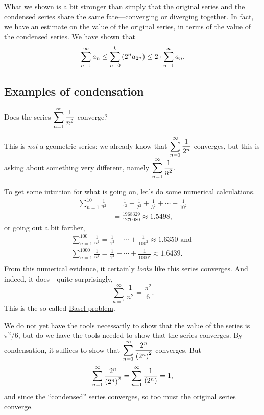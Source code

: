 What we shown is a bit stronger than simply that the original series and the condensed series share the same fate---converging or diverging together.  In fact, we have an estimate on the value of the original series, in terms of the value of the condensed series.  We have shown that
$$
\sum_{n=1}^\infty a_n \leq \displaystyle\sum_{n=0}^k \left( 2^n a_{2^n} \right) \leq 2 \cdot \sum_{n=1}^\infty a_n.
$$

\subsection{Examples of condensation}

\begin{example}
Does the series $\displaystyle\sum_{n=1}^\infty \displaystyle\frac{1}{n^2}$ converge?
\end{example}

This is \textit{not} a geometric series: we already know that $\displaystyle\sum_{n=1}^\infty \displaystyle\frac{1}{2^n}$ converges, but this is asking about something very different, namely $\displaystyle\sum_{n=1}^\infty \displaystyle\frac{1}{n^2}$.

\begin{solution}
To get some intuition for what is going on, let's do some numerical calculations.
\begin{align*}
\sum_{n=1}^{10} \frac{1}{n^2} &= \frac{1}{1^2} + \frac{1}{2^2} + \frac{1}{3^2} + \cdots + \frac{1}{10^2} \\
&= \frac{1968329}{1270080} \approx 1.5498,
\end{align*}
or going out a bit farther,
\begin{align*}
\sum_{n=1}^{100} \frac{1}{n^2} = \frac{1}{1^2} + \cdots + \frac{1}{100^2} \approx 1.6350 \mbox{ and } \\
\sum_{n=1}^{1000} \frac{1}{n^2} = \frac{1}{1^2} + \cdots + \frac{1}{1000^2} \approx 1.6439. \\
\end{align*}
From this numerical evidence, it certainly \textit{looks} like this
series converges.  And indeed, it does---quite surprisingly,
$$
\sum_{n=1}^{\infty} \frac{1}{n^2} = \frac{\pi^{2}}{6}.
$$
This is the so-called
\href{http://en.wikipedia.org/wiki/Basel_problem}{Basel
  problem}.

We do not yet have the tools necessarily to show that the value of the
series is $\pi^2/6$, but do we have the tools needed to show that the
series converges.  By condensation, it suffices to show that
$\displaystyle\sum_{n=1}^\infty \displaystyle\frac{2^n}{\left( 2^n \right)^2}$ converges.
But
$$
\displaystyle\sum_{n=1}^\infty \displaystyle\frac{2^n}{\left( 2^n \right)^2} = 
\displaystyle\sum_{n=1}^\infty \displaystyle\frac{1}{\left( 2^{n} \right)} = 1,
$$
and since the ``condensed'' series converges, so too must the original series converge.
\end{solution}

